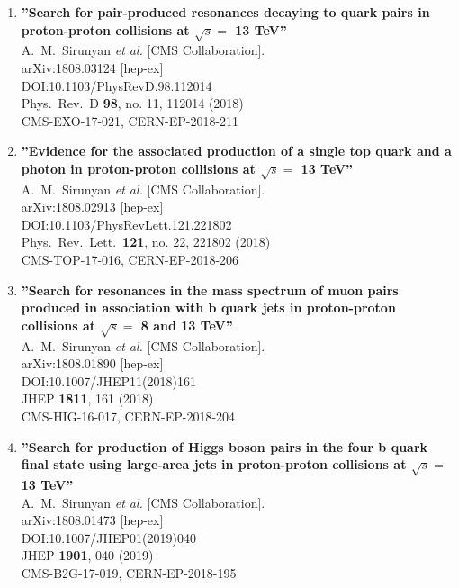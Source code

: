 \begin{enumerate}
\item%
{\bf ''Search for pair-produced resonances decaying to quark pairs in proton-proton collisions at $\sqrt{s}=$ 13 TeV''}
  \\{}A.~M.~Sirunyan {\it et al.} [CMS Collaboration].
  \\{}arXiv:1808.03124 [hep-ex]
  \\{}DOI:10.1103/PhysRevD.98.112014
  \\{}Phys.\ Rev.\ D {\bf 98}, no. 11, 112014 (2018)
  \\{}CMS-EXO-17-021, CERN-EP-2018-211

\item%
{\bf ''Evidence for the associated production of a single top quark and a photon in proton-proton collisions at $\sqrt{s}=$ 13 TeV''}
  \\{}A.~M.~Sirunyan {\it et al.} [CMS Collaboration].
  \\{}arXiv:1808.02913 [hep-ex]
  \\{}DOI:10.1103/PhysRevLett.121.221802
  \\{}Phys.\ Rev.\ Lett.\  {\bf 121}, no. 22, 221802 (2018)
  \\{}CMS-TOP-17-016, CERN-EP-2018-206

\item%
{\bf ''Search for resonances in the mass spectrum of muon pairs produced in association with b quark jets in proton-proton collisions at $\sqrt{s} =$ 8 and 13 TeV''}
  \\{}A.~M.~Sirunyan {\it et al.} [CMS Collaboration].
  \\{}arXiv:1808.01890 [hep-ex]
  \\{}DOI:10.1007/JHEP11(2018)161
  \\{}JHEP {\bf 1811}, 161 (2018)
  \\{}CMS-HIG-16-017, CERN-EP-2018-204

\item%
{\bf ''Search for production of Higgs boson pairs in the four b quark final state using large-area jets in proton-proton collisions at $\sqrt{s}=$ 13 TeV''}
  \\{}A.~M.~Sirunyan {\it et al.} [CMS Collaboration].
  \\{}arXiv:1808.01473 [hep-ex]
  \\{}DOI:10.1007/JHEP01(2019)040
  \\{}JHEP {\bf 1901}, 040 (2019)
  \\{}CMS-B2G-17-019, CERN-EP-2018-195


\end{enumerate}

